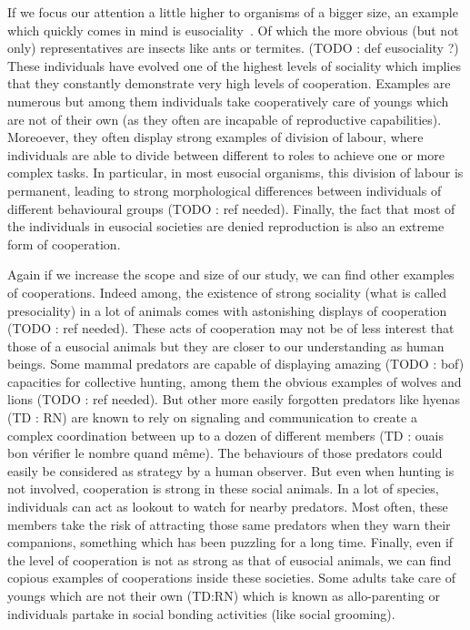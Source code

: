     If we focus our attention a little higher to organisms of a bigger size, an example which quickly comes in mind is eusociality~\parencite{Wilson1990}. Of which the more obvious (but not only) representatives are insects like ants or termites. (TODO : def eusociality ?) These individuals have evolved one of the highest levels of sociality which implies that they constantly demonstrate very high levels of cooperation. Examples are numerous but among them individuals take cooperatively care of youngs which are not of their own (as they often are incapable of reproductive capabilities). Moreoever, they often display strong examples of division of labour, where individuals are able to divide between different to roles to achieve one or more complex tasks. In particular, in most eusocial organisms, this division of labour is permanent, leading to strong morphological differences between individuals of different behavioural groups (TODO : ref needed). Finally, the fact that most of the individuals in eusocial societies are denied reproduction is also an extreme form of cooperation.


    Again if we increase the scope and size of our study, we can find other examples of cooperations. Indeed among, the existence of strong sociality (what is called presociality) in a lot of animals comes with astonishing displays of cooperation (TODO : ref needed). These acts of cooperation may not be of less interest that those of a eusocial animals but they are closer to our understanding as human beings. Some mammal predators are capable of displaying amazing (TODO : bof) capacities for collective hunting, among them the obvious examples of wolves and lions (TODO : ref needed). But other more easily forgotten predators like hyenas (TD : RN) are known to rely on signaling and communication to create a complex coordination between up to a dozen of different members (TD : ouais bon vérifier le nombre quand même). The behaviours of those predators could easily be considered as strategy by a human observer. But even when hunting is not involved, cooperation is strong in these social animals. In a lot of species, individuals can act as lookout to watch for nearby predators. Most often, these members take the risk of attracting those same predators when they warn their companions, something which has been puzzling for a long time. Finally, even if the level of cooperation is not as strong as that of eusocial animals, we can find copious examples of cooperations inside these societies. Some adults take care of youngs which are not their own (TD:RN) which is known as allo-parenting or individuals partake in social bonding activities (like social grooming).

